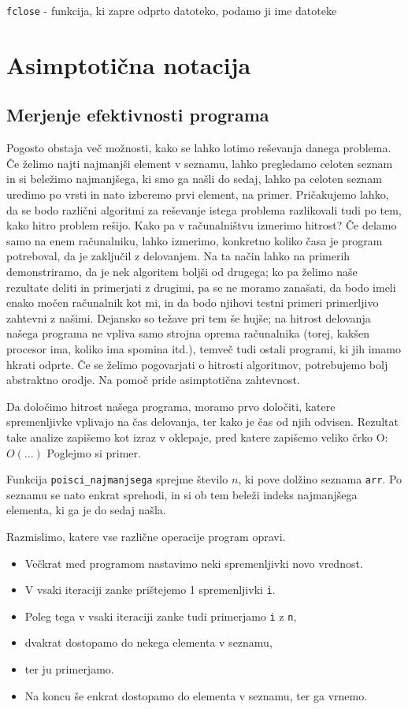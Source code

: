 \documentclass{book}
\begin{document}
\verb+fclose+ - funkcija, ki zapre odprto datoteko, podamo ji ime datoteke

\chapter{Asimptotična notacija}

\section{Merjenje efektivnosti programa}

Pogosto obstaja več možnosti, kako se lahko lotimo reševanja danega problema.
Če želimo najti najmanjši element v seznamu, lahko pregledamo celoten seznam in
si beležimo najmanjšega, ki smo ga našli do sedaj, lahko pa celoten seznam
uredimo po vrsti in nato izberemo prvi element, na primer.
Pričakujemo lahko, da se bodo različni algoritmi za reševanje istega problema
razlikovali tudi po tem, kako hitro problem rešijo.
Kako pa v računalništvu izmerimo hitrost? Če delamo samo na enem računalniku,
lahko izmerimo, konkretno koliko časa je program potreboval, da je zaključil
z delovanjem. Na ta način lahko na primerih demonstriramo, da je nek algoritem
boljši od drugega; ko pa želimo naše rezultate deliti in primerjati z drugimi,
pa se ne moramo zanašati, da bodo imeli enako močen računalnik kot mi, in da
bodo njihovi testni primeri primerljivo zahtevni z našimi. Dejansko so težave
pri tem še hujše; na hitrost delovanja našega programa ne vpliva samo strojna
oprema računalnika (torej, kakšen procesor ima, koliko ima spomina itd.), temveč
tudi ostali programi, ki jih imamo hkrati odprte.
Če se želimo pogovarjati o hitrosti algoritmov, potrebujemo bolj abstraktno
orodje. Na pomoč pride asimptotična zahtevnost.

Da določimo hitrost našega programa, moramo prvo določiti, katere spremenljivke
vplivajo na čas delovanja, ter kako je čas od njih odvisen.
Rezultat take analize zapišemo kot izraz v oklepaje, pred katere zapišemo
veliko črko O: \(O(\ldots)\)
Poglejmo si primer.


Funkcija \verb+poisci_najmanjsega+ sprejme število \(n\), ki pove dolžino seznama
\verb+arr+. Po seznamu se nato enkrat sprehodi, in si ob tem beleži indeks
najmanjšega elementa, ki ga je do sedaj našla.

Razmislimo, katere vse različne operacije program opravi.
\begin{itemize}
  \item 
	Večkrat med programom nastavimo neki spremenljivki novo vrednost.
  \item
	V vsaki iteraciji zanke prištejemo 1 spremenljivki \verb+i+.
  \item
	Poleg tega v vsaki iteraciji zanke tudi primerjamo \verb+i+ z \verb+n+,
  \item
	dvakrat dostopamo do nekega elementa v seznamu,
  \item
	ter ju primerjamo.
  \item
	Na koncu še enkrat dostopamo do elementa v seznamu, ter ga vrnemo.
\end{itemize}
\end{document}

